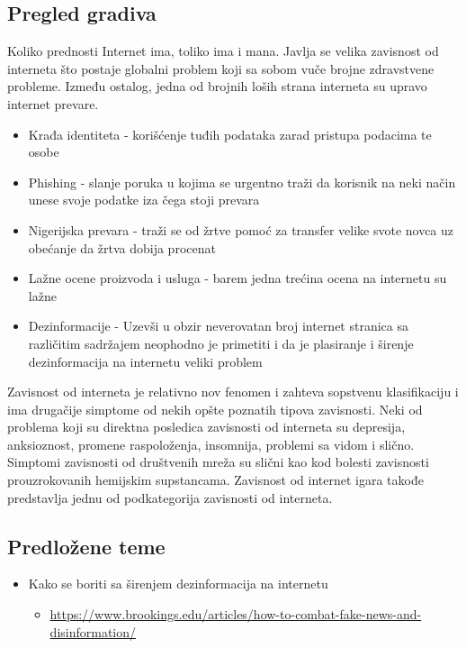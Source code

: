 \documentclass[a4paper,12pt]{article}
\begin{document}
\subsection{Pregled gradiva}
Koliko prednosti Internet ima, toliko ima i mana. Javlja se velika zavisnost od interneta što postaje globalni problem koji sa sobom vuče brojne zdravstvene probleme. Između ostalog, jedna od brojnih loših strana interneta su upravo internet prevare. 
\begin{itemize}
    \item Krađa identiteta - korišćenje tuđih podataka zarad pristupa podacima te osobe
    \item Phishing - slanje poruka u kojima se urgentno traži da korisnik na neki način unese svoje podatke iza čega stoji prevara
    \item Nigerijska prevara - traži se od žrtve pomoć za transfer velike svote novca uz obećanje da žrtva dobija procenat
    \item Lažne ocene proizvoda i usluga - barem jedna trećina ocena na internetu su lažne
    \item Dezinformacije - Uzevši u obzir neverovatan broj internet stranica sa različitim sadržajem neophodno je primetiti i da je plasiranje i širenje dezinformacija na internetu veliki problem
    
\end{itemize}
Zavisnost od interneta je relativno nov fenomen i zahteva sopstvenu klasifikaciju i ima drugačije simptome od nekih opšte poznatih tipova zavisnosti. Neki od problema koji su direktna posledica zavisnosti od interneta su depresija, anksioznost, promene raspoloženja, insomnija, problemi sa vidom i slično. Simptomi zavisnosti od društvenih mreža su slični kao kod bolesti zavisnosti prouzrokovanih hemijskim supstancama. Zavisnost od internet igara takođe predstavlja jednu od podkategorija zavisnosti od interneta.
\subsection{Predložene teme}
\begin{itemize}
    \item Kako se boriti sa širenjem dezinformacija na internetu
    \begin{itemize}
        \item \url{https://www.brookings.edu/articles/how-to-combat-fake-news-and-disinformation/}
    \end{itemize}
\end{itemize}
\end{document}
